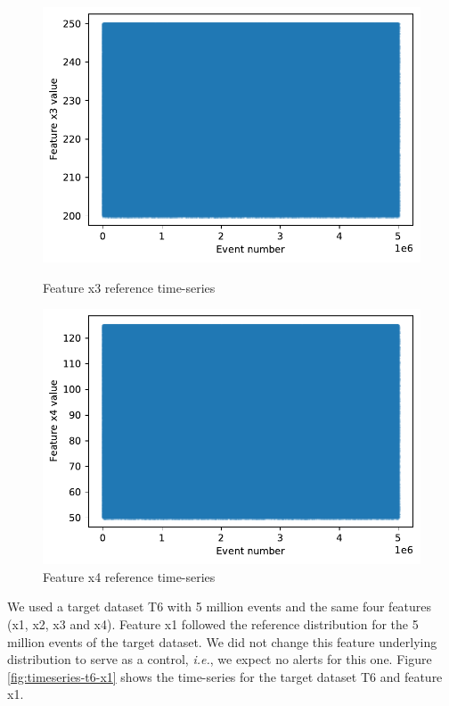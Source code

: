 \begin{figure}[!htb]
\begin{minipage}[b]{0.5\linewidth}
    \includegraphics[width=1\linewidth]{figures/timeseries-r6-x3.pdf} 
    \caption{Feature x3 reference time-series} 
    \label{fig:timeseries-r6-x3} 
    \vspace{4ex}
  \end{minipage}%
  \begin{minipage}[b]{0.5\linewidth}
    \centering
    \includegraphics[width=1\linewidth]{figures/timeseries-r6-x4.pdf} 
    \caption{Feature x4 reference time-series} 
    \label{fig:timeseries-r6-x4} 
    \vspace{4ex}
  \end{minipage} 
\end{figure}

We used a target dataset T6 with 5 million events and the same four features (x1, x2, x3 and x4). Feature x1 followed the reference distribution for the 5 million events of the target dataset. We did not change this feature underlying distribution to serve as a control, \textit{i.e.}, we expect no alerts for this one. Figure \ref{fig:timeseries-t6-x1} shows the time-series for the target dataset T6 and feature x1.

